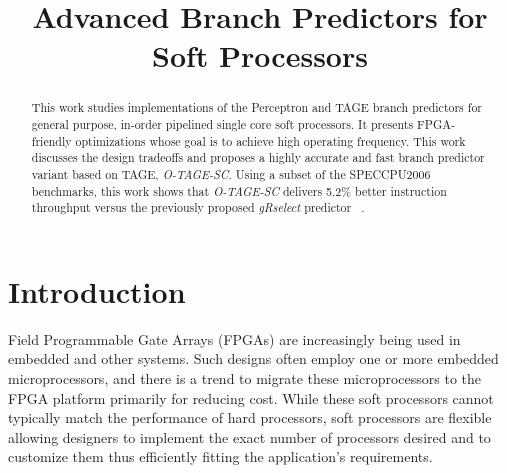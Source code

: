 \documentclass[conference]{IEEEtran}
\begin{document}
\title{Advanced Branch Predictors for Soft Processors}


\author{
}

\maketitle


\begin{abstract}
This work studies implementations of the Perceptron \cite{perceptron} and TAGE \cite{tage} branch predictors for general purpose, in-order pipelined single core soft processors. It presents FPGA-friendly optimizations whose goal is to achieve high operating frequency. This work discusses the design tradeoffs and proposes a highly accurate and fast branch predictor variant based on TAGE, \textit{O-TAGE-SC}. Using a subset of the SPECCPU2006 benchmarks, this work shows that \textit{O-TAGE-SC} delivers 5.2\% better instruction throughput versus the previously proposed \textit{gRselect} predictor ~\cite{StratixIVM9K}.
\end{abstract}


\IEEEpeerreviewmaketitle


\section{Introduction}
\label{sec:intro}
Field Programmable Gate Arrays (FPGAs) are increasingly being used in embedded and other systems. Such designs often employ one or more embedded microprocessors, and there is a trend to migrate these microprocessors to the FPGA platform primarily for reducing cost. While these soft processors cannot typically match the performance of hard processors, soft processors are flexible allowing designers to implement the exact number of processors desired and to customize them thus efficiently fitting the application's requirements.
\end{document}
